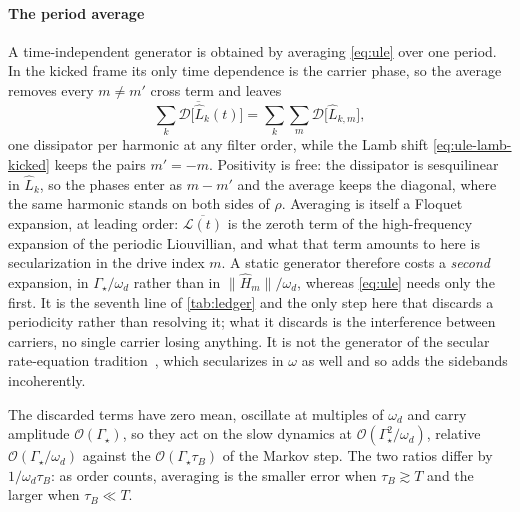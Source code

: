 \documentclass[a4paper,11pt]{article}
\newcommand{\Dcal}{\mathcal{D}}
\begin{document}
\paragraph{The period average}
A time-independent generator is obtained by averaging \eqref{eq:ule} over one period. In the kicked frame its only time dependence is the carrier phase, so the average removes every $m\neq m'$ cross term and leaves
\begin{equation}\label{eq:ule-averaged}
  \overline{\sum_k\Dcal\big[\hat L_k(t)\big]} = \sum_k\sum_m \Dcal\big[\hat L_{k,m}\big],
\end{equation}
one dissipator per harmonic at any filter order, while the Lamb shift \eqref{eq:ule-lamb-kicked} keeps the pairs $m'=-m$. Positivity is free: the dissipator is sesquilinear in $\hat L_k$, so the phases enter as $m-m'$ and the average keeps the diagonal, where the same harmonic stands on both sides of $\rho$. Averaging is itself a Floquet expansion, at leading order: $\overline{\mathcal L(t)}$ is the zeroth term of the high-frequency expansion of the periodic Liouvillian, and what that term amounts to here is secularization in the drive index $m$. A static generator therefore costs a \emph{second} expansion, in $\Gamma_{\!\star}/\omega_d$ rather than in $\lVert\hat H_m\rVert/\omega_d$, whereas \eqref{eq:ule} needs only the first. It is the seventh line of \cref{tab:ledger} and the only step here that discards a periodicity rather than resolving it; what it discards is the interference between carriers, no single carrier losing anything. It is not the generator of the secular rate-equation tradition~\cite{Grifoni1998Driven,hone2009Statisticala}, which secularizes in $\omega$ as well and so adds the sidebands incoherently.

The discarded terms have zero mean, oscillate at multiples of $\omega_d$ and carry amplitude $\mathcal O(\Gamma_{\!\star})$, so they act on the slow dynamics at $\mathcal O(\Gamma_{\!\star}^2/\omega_d)$, relative $\mathcal O(\Gamma_{\!\star}/\omega_d)$ against the $\mathcal O(\Gamma_{\!\star}\tau_B)$ of the Markov step. The two ratios differ by $1/\omega_d\tau_B$: as order counts, averaging is the smaller error when $\tau_B\gtrsim T$ and the larger when $\tau_B\ll T$.
\end{document}
